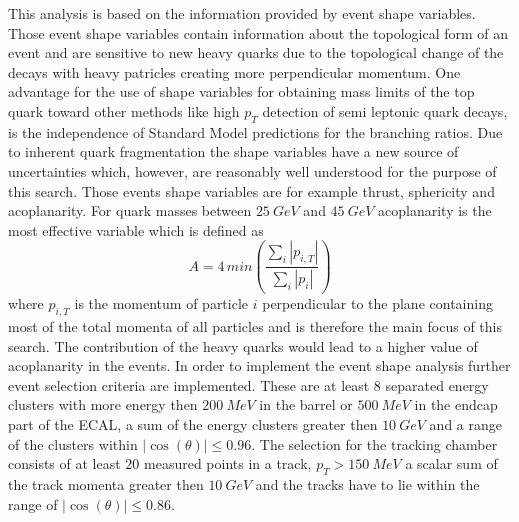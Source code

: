 \documentclass[11pt, twocolumn, a4paper]{article}
\begin{document}
This analysis is based on the information provided by event shape variables.
Those event shape variables contain information about the topological form of an event and are sensitive to new heavy quarks due to the topological change of the decays with heavy patricles creating more perpendicular momentum.
One advantage for the use of shape variables for obtaining mass limits of the top quark toward other methods like high $p_T$ detection of semi leptonic quark decays, is the independence of Standard Model predictions for the branching ratios.
Due to inherent quark fragmentation the shape variables have a new source of uncertainties which, however, are reasonably well understood for the purpose of this search.
Those events shape variables are for example thrust, sphericity and acoplanarity.
For quark masses between $\SI{25}{GeV}$ and $\SI{45}{GeV}$ acoplanarity is the most effective variable which is defined as
\begin{equation*}
	A = 4 \, min\left(\frac{\sum_i |p_{i,T}|}{\sum_i |p_i|}\right)
\end{equation*}
where $p_{i,T}$ is the momentum of particle $i$ perpendicular to the plane containing most of the total momenta of all particles and is therefore the main focus of this search.
The contribution of the heavy quarks would lead to a higher value of acoplanarity in the events.
In order to implement the event shape analysis further event selection criteria are implemented.
These are at least 8 separated energy clusters with more energy then $\SI{200}{MeV}$ in the barrel or $\SI{500}{MeV}$ in the endcap part of the ECAL, a sum of the energy clusters greater then $\SI{10}{GeV}$ and a range of the clusters within ${|\cos{(\theta)}|\le \num{0.96}}$. 
The selection for the tracking chamber consists of at least $20$ measured points in a track, $p_T > \SI{150}{MeV}$ a scalar sum of the track momenta greater then $\SI{10}{GeV}$ and the tracks have to lie within the range of ${|\cos{(\theta)}|\le \num{0.86}}$.\\
\end{document}
